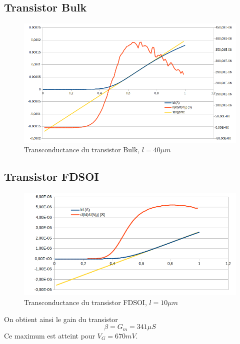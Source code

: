 \documentclass[a4paper,11pt]{report}
\begin{document}
\subsection{Transistor Bulk}
\begin{figure}
    \begin{center}
        \includegraphics[width=\textwidth]{Images/Bulk40-Transconductance}
        \caption{Transconductance du transistor Bulk, $l=40\mu m$}
        \label{fig:}
    \end{center}
\end{figure}

\subsection{Transistor FDSOI}
\begin{figure}
    \begin{center}
        \includegraphics[width=\textwidth]{Images/FD1-10-Transconductance}
        \caption{Transconductance du transistor FDSOI, $l=10\mu m$}
        \label{fig:}
    \end{center}
\end{figure}
\noindent On obtient ainsi le gain du transistor \[\beta=G_m=341\mu S\] Ce maximum est atteint pour $V_G=670mV$.
\end{document}

